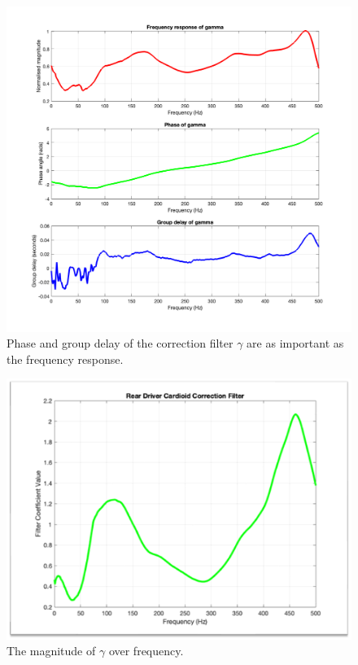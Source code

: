 \documentclass{report}
\begin{document}
            \begin{figure}[H]
                \centering
                \includegraphics[scale=0.25]{figs/grpDelay.png}%
                \caption{Phase and group delay of the correction filter $\gamma$ are as important as the frequency response.}
                \label{grpDelay}
            \end{figure}
            \begin{figure}[H]
                \centering
                \includegraphics[scale=0.35]{figs/gammaMagnitude.png}%
                \caption{The magnitude of $\gamma$ over frequency.}
                \label{gammaMagnitude}
            \end{figure}
\end{document}
